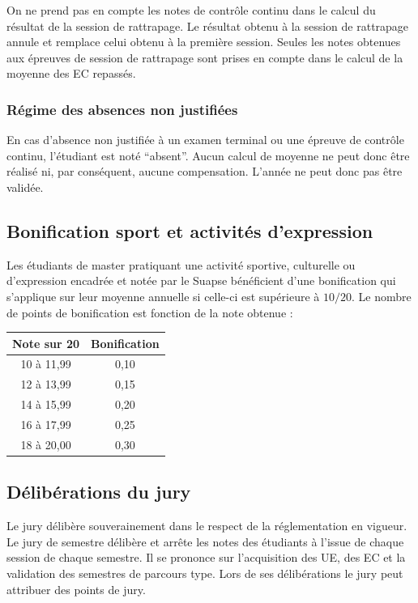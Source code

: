 \documentclass[a4paper,11pt]{article}
\begin{document}
On ne prend pas en compte les notes de contrôle continu dans le calcul du résultat de la session de rattrapage. Le résultat obtenu à la session de rattrapage annule et remplace celui obtenu à la première session. Seules les notes obtenues aux épreuves de session de rattrapage sont prises en compte dans le calcul de la moyenne des EC repassés.

\subsubsection{Régime des absences non justifiées}
En cas d'absence non justifiée à un examen terminal ou une épreuve de contrôle continu, l'étudiant est noté ``absent''. Aucun calcul de moyenne ne peut donc être réalisé ni, par conséquent, aucune compensation. L'année ne peut donc pas être validée.

\subsection{Bonification sport et activités d'expression}

Les étudiants de master pratiquant une activité sportive, culturelle ou d'expression encadrée et notée par le Suapse bénéficient d'une bonification qui s'applique sur leur moyenne annuelle si celle-ci est supérieure à $10/20$. Le nombre de points de bonification est fonction de la note obtenue :

\begin{table}[htpb] 
\begin{center}
    \begin{tabular}{c c}
        \toprule
        Note sur 20 & Bonification\\ 
        \midrule
        10 à 11,99 & 0,10 \\ 
        12 à 13,99 & 0,15 \\ 
        14 à 15,99 & 0,20 \\ 
        16 à 17,99 & 0,25 \\ 
        18 à 20,00 & 0,30 \\ 
        \bottomrule
    \end{tabular} 
\end{center}
\end{table}


\subsection{Délibérations du jury}
Le jury délibère souverainement dans le respect de la réglementation en vigueur.
Le jury de semestre délibère et arrête les notes des étudiants à l'issue de chaque session de chaque semestre. Il se prononce sur l'acquisition des UE, des EC et la validation des semestres de parcours type.
Lors de ses délibérations le jury peut attribuer des points de jury.
\end{document}
